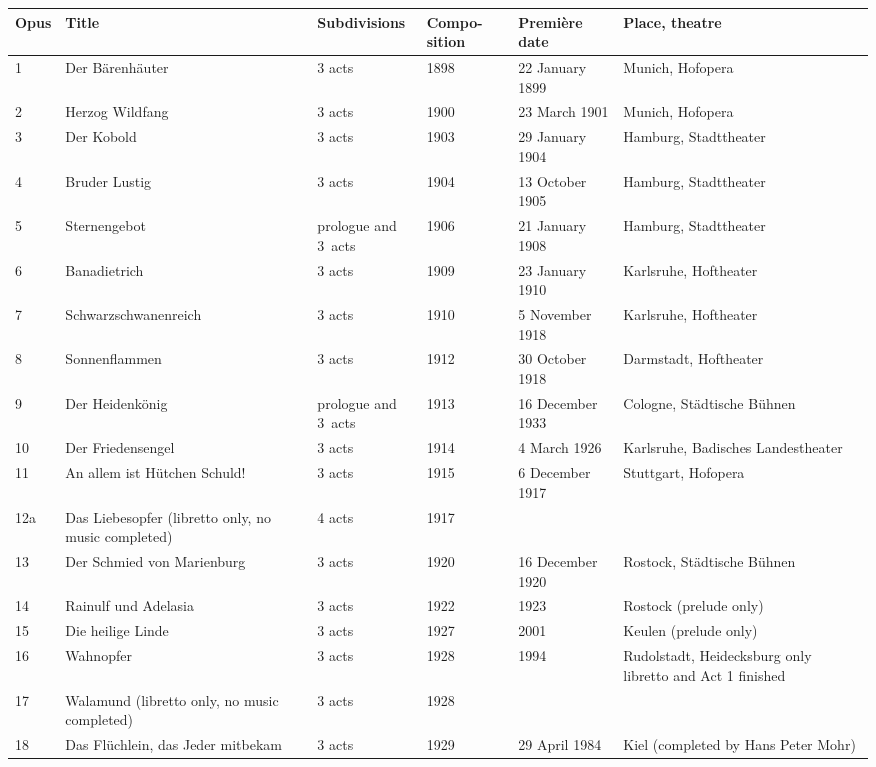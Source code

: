 \documentclass{article}
\begin{document}
\begin{tabular}{llllll}
\toprule
Opus & Title & Sub­divisions & Compo-sition & Première date & Place, theatre \\
\midrule
1 & Der Bärenhäuter & 3 acts & 1898 & 22 January 1899 & Munich, Hofopera \\
2 & Herzog Wildfang & 3 acts & 1900 & 23 March 1901 & Munich, Hofopera \\
3 & Der Kobold & 3 acts & 1903 & 29 January 1904 & Hamburg, Stadttheater \\
4 & Bruder Lustig & 3 acts & 1904 & 13 October 1905 & Hamburg, Stadttheater \\
5 & Sternengebot & prologue and 3 acts & 1906 & 21 January 1908 & Hamburg, Stadttheater \\
6 & Banadietrich & 3 acts & 1909 & 23 January 1910 & Karlsruhe, Hoftheater \\
7 & Schwarzschwanenreich & 3 acts & 1910 & 5 November 1918 & Karlsruhe, Hoftheater \\
8 & Sonnenflammen & 3 acts & 1912 & 30 October 1918 & Darmstadt, Hoftheater \\
9 & Der Heidenkönig & prologue and 3 acts & 1913 & 16 December 1933 & Cologne, Städtische Bühnen \\
10 & Der Friedensengel & 3 acts & 1914 & 4 March 1926 & Karlsruhe, Badisches Landestheater \\
11 & An allem ist Hütchen Schuld! & 3 acts & 1915 & 6 December 1917 & Stuttgart, Hofopera \\
12a & Das Liebesopfer (libretto only, no music completed) & 4 acts & 1917 &  &  \\
13 & Der Schmied von Marienburg & 3 acts & 1920 & 16 December 1920 & Rostock, Städtische Bühnen \\
14 & Rainulf und Adelasia & 3 acts & 1922 & 1923 & Rostock (prelude only) \\
15 & Die heilige Linde & 3 acts & 1927 & 2001 & Keulen (prelude only) \\
16 & Wahnopfer & 3 acts & 1928 & 1994 & Rudolstadt, Heidecksburg only libretto and Act 1 finished \\
17 & Walamund (libretto only, no music completed) & 3 acts & 1928 &  &  \\
18 & Das Flüchlein, das Jeder mitbekam & 3 acts & 1929 & 29 April 1984 & Kiel (completed by Hans Peter Mohr) \\
\bottomrule
\end{tabular}
\end{document}
